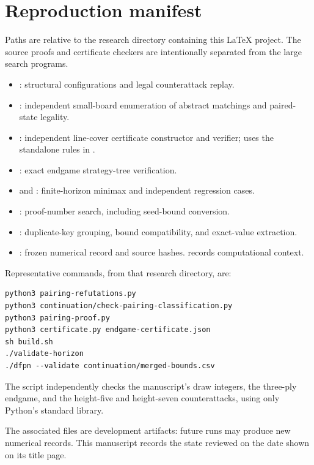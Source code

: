 \documentclass[11pt]{article}
\theoremstyle{definition}
\theoremstyle{remark}
\begin{document}
\section{Reproduction manifest}\label{app:manifest}
Paths are relative to the research directory containing this LaTeX project.
The source proofs and certificate checkers are intentionally separated from
the large search programs.
\begin{itemize}
\item {}: structural configurations and legal
counterattack replay.
\item {}: independent
small-board enumeration of abstract matchings and paired-state legality.
\item {}: independent line-cover certificate constructor
and verifier; uses the standalone rules in .
\item {}: exact endgame strategy-tree verification.
\item {} and : finite-horizon
minimax and independent regression cases.
\item {}: proof-number search, including seed-bound conversion.
\item {}: duplicate-key grouping, bound compatibility,
and exact-value extraction.
\item {}: frozen numerical record and source
hashes.  records computational context.
\end{itemize}

Representative commands, from that research directory, are:
\begin{Verbatim}[fontsize=\footnotesize,frame=single]
python3 pairing-refutations.py
python3 continuation/check-pairing-classification.py
python3 pairing-proof.py
python3 certificate.py endgame-certificate.json
sh build.sh
./validate-horizon
./dfpn --validate continuation/merged-bounds.csv
\end{Verbatim}
The script  independently checks
the manuscript's draw integers, the three-ply endgame, and the height-five
and height-seven counterattacks, using only Python's standard library.

The associated files are development artifacts: future runs may produce
new numerical records. This manuscript records the state reviewed on the
date shown on its title page.
\end{document}
